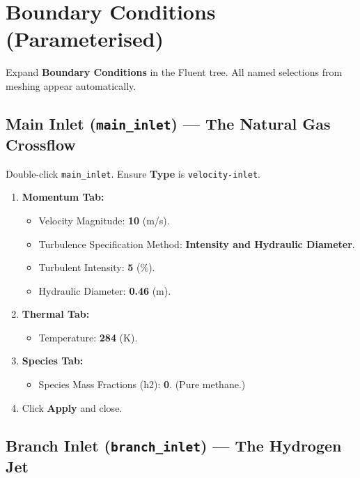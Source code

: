 \documentclass[12pt,a4paper]{report}
\begin{document}
\chapter{Boundary Conditions (Parameterised)}
\label{ch:bc}

Expand \textbf{Boundary Conditions} in the Fluent tree.  All named
selections from meshing appear automatically.

\section{Main Inlet (\texttt{main\_inlet}) --- The Natural Gas Crossflow}

Double-click \texttt{main\_inlet}.  Ensure \textbf{Type} is
\texttt{velocity-inlet}.

\begin{enumerate}
  \item \textbf{Momentum Tab:}
  \begin{itemize}
    \item Velocity Magnitude: \textbf{10} (m/s).
    \item Turbulence Specification Method: \textbf{Intensity and
          Hydraulic Diameter}.
    \item Turbulent Intensity: \textbf{5} (\%).
    \item Hydraulic Diameter: \textbf{0.46} (m).
  \end{itemize}
  \item \textbf{Thermal Tab:}
  \begin{itemize}
    \item Temperature: \textbf{284} (K).
  \end{itemize}
  \item \textbf{Species Tab:}
  \begin{itemize}
    \item Species Mass Fractions (h2): \textbf{0}.
          \quad(Pure methane.)
  \end{itemize}
  \item Click \textbf{Apply} and close.
\end{enumerate}

\section{Branch Inlet (\texttt{branch\_inlet}) --- The Hydrogen Jet}
\end{document}
